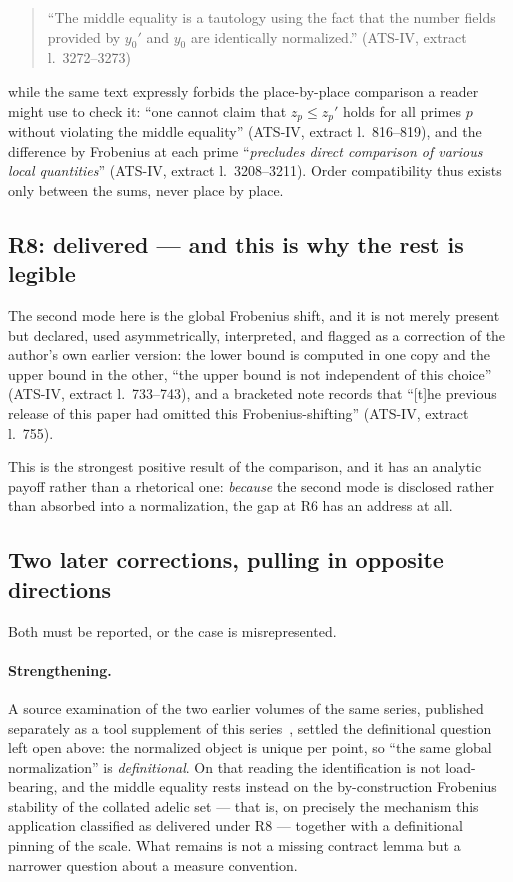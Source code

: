 \documentclass[11pt,a4paper]{article}
\theoremstyle{definition}
\newcommand{\anchor}[2]{(#1, extract l.~#2)}
\begin{document}
\begin{quote}\small
``The middle equality is a tautology using the fact that the number fields
provided by $y_0'$ and $y_0$ are identically normalized.''
\hfill\anchor{ATS-IV}{3272--3273}
\end{quote}

while the same text expressly forbids the place-by-place comparison a reader might
use to check it: ``one cannot claim that $z_p \le z_p'$ holds for all primes $p$
without violating the middle equality'' \anchor{ATS-IV}{816--819}, and the
difference by Frobenius at each prime ``\emph{precludes direct comparison of
various local quantities}'' \anchor{ATS-IV}{3208--3211}. Order compatibility thus
exists only between the sums, never place by place.

\subsection{R8: delivered --- and this is why the rest is legible}

The second mode here is the global Frobenius shift, and it is not merely present
but declared, used asymmetrically, interpreted, and flagged as a correction of the
author's own earlier version: the lower bound is computed in one copy and the
upper bound in the other, ``the upper bound is not independent of this choice''
\anchor{ATS-IV}{733--743}, and a bracketed note records that ``[t]he previous
release of this paper had omitted this Frobenius-shifting''
\anchor{ATS-IV}{755}.

This is the strongest positive result of the comparison, and it has an analytic
payoff rather than a rhetorical one: \emph{because} the second mode is disclosed
rather than absorbed into a normalization, the gap at R6 has an address at all.

\subsection{Two later corrections, pulling in opposite directions}
\label{sec:caseC-nachtraege}

Both must be reported, or the case is misrepresented.

\paragraph{Strengthening.} A source examination of the two earlier volumes of the
same series, published separately as a tool supplement of this
series~\cite{GeigerGNC2026}, settled the definitional question left open above: the
normalized object is unique per point, so ``the same global normalization'' is
\emph{definitional}. On that reading the identification is not load-bearing, and
the middle equality rests instead on the by-construction Frobenius stability of
the collated adelic set --- that is, on precisely the mechanism this application
classified as delivered under R8 --- together with a definitional pinning of the
scale. What remains is not a missing contract lemma but a narrower question about
a measure convention.
\end{document}
